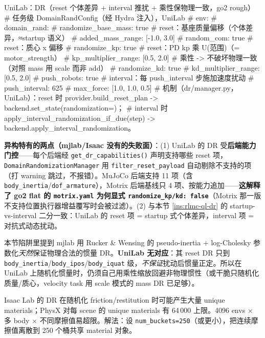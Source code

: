 \begin{codebox}[Python]{UniLab：DR（reset 个体差异 + interval 推扰 + 乘性保物理一致，go2 rough）}
# 任务级 DomainRandConfig（经 Hydra 注入），UniLab
# env:
#   domain_rand:
#     randomize_base_mass: true       # reset：基座质量偏移（个体差异，≈startup 语义）
#     added_mass_range: [-1.0, 3.0]
#     random_com: true                # reset：质心 x 偏移
#     randomize_kp: true              # reset：PD kp 乘 U(范围)（= motor_strength）
#     kp_multiplier_range: [0.5, 2.0] # 乘性 -> 不破坏物理一致（对照 mass 用 scale 而非 add）
#     randomize_kd: true
#     kd_multiplier_range: [0.5, 2.0]
#     push_robots: true               # interval：每 push_interval 步施加速度扰动
#     push_interval: 625
#     max_force: [1.0, 1.0, 0.5]
# 机制（dr/manager.py，UniLab）：reset 时 provider.build_reset_plan -> backend.set_state(randomization=)；
#   interval 时 apply_interval_randomization_if_due(step) -> backend.apply_interval_randomization。
\end{codebox}

\textbf{异构特有的两点（mjlab/Isaac 没有的失败面）}：(1) UniLab 的 DR 受\textbf{后端能力门控}——每个后端经 \verb|get_dr_capabilities()| 声明支持哪些 reset 项，\verb|DomainRandomizationManager| 用 \verb|filter_reset_payload| 自动剔除不支持的项（打 warning 跳过，不报错）。MuJoCo 后端支持 11 项（含 \verb|body_inertia|/\verb|dof_armature|），Motrix 后端基线只 4 项、按能力追加——\textbf{这解释了 go2 flat 的 \texttt{motrix.yaml} 为何显式 \texttt{randomize\_kp/kd: false}}（Motrix 那一版不支持位置执行器增益覆写时会被过滤）。(2) 与本节 \cref{ins:rlmc-ql-dr} 的 startup-vs-interval 二分一致：UniLab 的 reset 项 = startup 式个体差异，interval 项 = 对抗式动态扰动。

\begin{note}
本节陷阱里提到 mjlab 用 Rucker \& Wensing 的 pseudo-inertia + log-Cholesky 参数化\emph{天然}保证物理合法的惯量 DR。\textbf{UniLab 无对应}：其 reset DR 只到 \verb|body_inertia|/\verb|body_ipos|/\verb|body_iquat| 级，\emph{不保证}扰动后惯量正定。所以在 UniLab 上随机化惯量时，仍须自己用乘性缩放回避非物理惯性（或干脆只随机化质量/质心，velocity task 用 scale 模式的 mass DR 已足够）。
\end{note}

\begin{note}
Isaac Lab 的 DR 在随机化 friction/restitution 时可能产生大量 unique materials；PhysX 对每 scene 的 unique materials 有 64\,000 上限。4096 envs $\times$ 多 body $\times$ 不同摩擦值易超限。解法：设 \verb|num_buckets=250|（或更小），把连续摩擦值离散到 250 个桶共享 material 对象。
\end{note}


